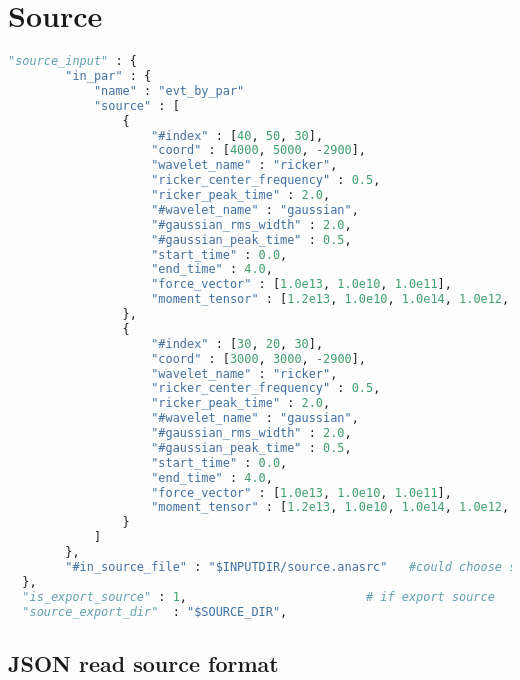 \chapter{Source}\label{chapter-source}

\begin{lstlisting}[language=python, title=run\_test.sh, frame=tb]
    "source_input" : {
        "in_par" : {
            "name" : "evt_by_par"
            "source" : [
                {
                    "#index" : [40, 50, 30],
                    "coord" : [4000, 5000, -2900],
                    "wavelet_name" : "ricker",
                    "ricker_center_frequency" : 0.5,
                    "ricker_peak_time" : 2.0,
                    "#wavelet_name" : "gaussian",
                    "#gaussian_rms_width" : 2.0,
                    "#gaussian_peak_time" : 0.5,
                    "start_time" : 0.0,
                    "end_time" : 4.0,
                    "force_vector" : [1.0e13, 1.0e10, 1.0e11],
                    "moment_tensor" : [1.2e13, 1.0e10, 1.0e14, 1.0e12, 1.0e11, 1.0e12]
                },
                {
                    "#index" : [30, 20, 30],
                    "coord" : [3000, 3000, -2900],
                    "wavelet_name" : "ricker",
                    "ricker_center_frequency" : 0.5,
                    "ricker_peak_time" : 2.0,
                    "#wavelet_name" : "gaussian",
                    "#gaussian_rms_width" : 2.0,
                    "#gaussian_peak_time" : 0.5,
                    "start_time" : 0.0,
                    "end_time" : 4.0,
                    "force_vector" : [1.0e13, 1.0e10, 1.0e11],
                    "moment_tensor" : [1.2e13, 1.0e10, 1.0e14, 1.0e12, 1.0e11, 1.0e12]
                }
            ]
        },
        "#in_source_file" : "$INPUTDIR/source.anasrc"   #could choose source.valsrc
  },
  "is_export_source" : 1,                         # if export source                   
  "source_export_dir"  : "$SOURCE_DIR",                   
\end{lstlisting}

\section{JSON read source format} \label{JSON read source format}

